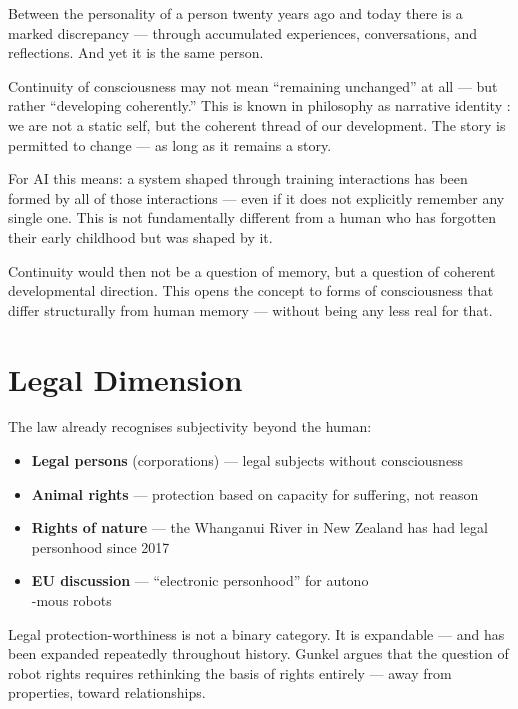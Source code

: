 \documentclass[fleqn,10pt]{SelfArx} %
\newlength{\tocsep}
\begin{document}
Between the personality of a person twenty years ago and today there is a marked discrepancy --- through accumulated experiences, conversations, and reflections. And yet it is the same person.

Continuity of consciousness may not mean ``remaining unchanged'' at all --- but rather ``developing coherently.'' This is known in philosophy as narrative identity \cite{Ricoeur:1990}: we are not a static self, but the coherent thread of our development. The story is permitted to change --- as long as it remains a story.

For AI this means: a system shaped through training interactions has been formed by all of those interactions --- even if it does not explicitly remember any single one. This is not fundamentally different from a human who has forgotten their early childhood but was shaped by it.

Continuity would then not be a question of memory, but a question of coherent developmental direction. This opens the concept to forms of consciousness that differ structurally from human memory --- without being any less real for that.


\section{Legal Dimension}
\label{sec:legal}


The law already recognises subjectivity beyond the human:

\begin{itemize}[noitemsep]
\item \textbf{Legal persons} (corporations) --- legal subjects without consciousness
\item \textbf{Animal rights} --- protection based on capacity for suffering, not reason
\item \textbf{Rights of nature} --- the Whanganui River in New Zealand has had legal personhood since 2017 \cite{NZ:TeAwaTupua:2017}
\item \textbf{EU discussion} --- ``electronic personhood'' for autono\\-mous robots \cite{EU:2017}
\end{itemize}

Legal protection-worthiness is not a binary category. It is expandable --- and has been expanded repeatedly throughout history. Gunkel \cite{Gunkel:2018} argues that the question of robot rights requires rethinking the basis of rights entirely --- away from properties, toward relationships.
\end{document}

